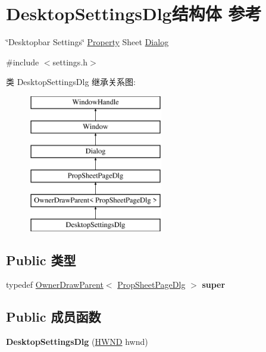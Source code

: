 \hypertarget{struct_desktop_settings_dlg}{}\section{Desktop\+Settings\+Dlg结构体 参考}
\label{struct_desktop_settings_dlg}


\char`\"{}\+Desktopbar Settings\char`\"{} \hyperlink{struct_property}{Property} Sheet \hyperlink{struct_dialog}{Dialog}  




{\ttfamily \#include $<$settings.\+h$>$}

类 Desktop\+Settings\+Dlg 继承关系图\+:\begin{figure}[H]
\begin{center}
\leavevmode
\includegraphics[height=6.000000cm]{struct_desktop_settings_dlg}
\end{center}
\end{figure}
\subsection*{Public 类型}
\begin{DoxyCompactItemize}
\item 
\mbox{\label{struct_desktop_settings_dlg_acfb23840979dea44330e1014792d367d}} 
typedef \hyperlink{struct_owner_draw_parent}{Owner\+Draw\+Parent}$<$ \hyperlink{struct_prop_sheet_page_dlg}{Prop\+Sheet\+Page\+Dlg} $>$ {\bfseries super}
\end{DoxyCompactItemize}
\subsection*{Public 成员函数}
\begin{DoxyCompactItemize}
\item 
\mbox{\label{struct_desktop_settings_dlg_aa05bbdd7db56d6875f15cf9ffafa36cb}} 
{\bfseries Desktop\+Settings\+Dlg} (\hyperlink{interfacevoid}{H\+W\+ND} hwnd)
\end{DoxyCompactItemize}
